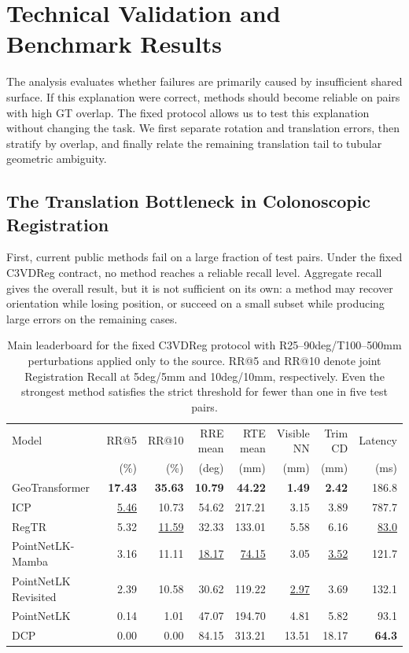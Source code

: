 \documentclass{bmvc2k}
\newcommand{\best}[1]{\textbf{#1}}
\newcommand{\second}[1]{\underline{#1}}
\begin{document}
\section{Technical Validation and Benchmark Results}
\label{sec:experiments}

The analysis evaluates whether failures are primarily caused by insufficient shared surface. If this explanation were correct, methods should become reliable on pairs with high GT overlap. The fixed protocol allows us to test this explanation without changing the task. We first separate rotation and translation errors, then stratify by overlap, and finally relate the remaining translation tail to tubular geometric ambiguity.

\subsection{The Translation Bottleneck in Colonoscopic Registration}
\label{sec:main_results}

First, current public methods fail on a large fraction of test pairs. Under the fixed C3VDReg contract, no method reaches a reliable recall level. Aggregate recall gives the overall result, but it is not sufficient on its own: a method may recover orientation while losing position, or succeed on a small subset while producing large errors on the remaining cases.

\begin{table}[t]
\centering
\caption{Main leaderboard for the fixed C3VDReg protocol with R25--90deg/T100--500mm perturbations applied only to the source. RR@5 and RR@10 denote joint Registration Recall at 5deg/5mm and 10deg/10mm, respectively. Even the strongest method satisfies the strict threshold for fewer than one in five test pairs.}
\label{tab:main_results}
\scriptsize
\setlength{\tabcolsep}{3.2pt}
\begin{tabular}{lrrrrrrr}
\hline
Model & RR@5 & RR@10 & RRE mean & RTE mean & Visible NN & Trim CD & Latency \\
 & (\%) & (\%) & (deg) & (mm) & (mm) & (mm) & (ms) \\
\hline
GeoTransformer~\cite{qin2022geometric} & \best{17.43} & \best{35.63} & \best{10.79} & \best{44.22} & \best{1.49} & \best{2.42} & 186.8 \\
ICP~\cite{besl1992method} & \second{5.46} & 10.73 & 54.62 & 217.21 & 3.15 & 3.89 & 787.7 \\
RegTR~\cite{yew2022regtr} & 5.32 & \second{11.59} & 32.33 & 133.01 & 5.58 & 6.16 & \second{83.0} \\
PointNetLK-Mamba & 3.16 & 11.11 & \second{18.17} & \second{74.15} & 3.05 & \second{3.52} & 121.7 \\
PointNetLK Revisited~\cite{li2021pointnetlk} & 2.39 & 10.58 & 30.62 & 119.22 & \second{2.97} & 3.69 & 132.1 \\
PointNetLK~\cite{aoki2019pointnetlk} & 0.14 & 1.01 & 47.07 & 194.70 & 4.81 & 5.82 & 93.1 \\
DCP~\cite{wang2019deep} & 0.00 & 0.00 & 84.15 & 313.21 & 13.51 & 18.17 & \best{64.3} \\
\hline
\end{tabular}
\end{table}
\end{document}
